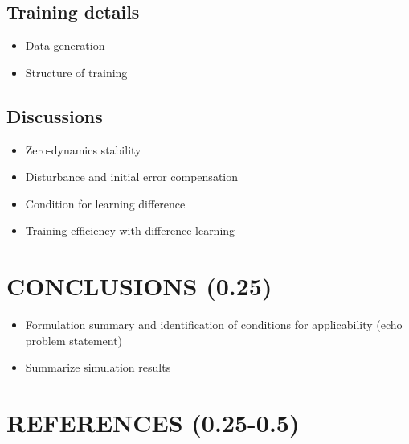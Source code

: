 \subsection{Training details}
\begin{itemize}
\color{grey1}
\item Data generation
\item Structure of training
\end{itemize}

\subsection{Discussions}
\begin{itemize}
\color{grey1}
\item Zero-dynamics stability
\item Disturbance and initial error compensation
\item Condition for learning difference
\item Training efficiency with difference-learning
\end{itemize}

\section{CONCLUSIONS (0.25)}
\label{sec:conclusions}
\begin{itemize}
\color{grey1}
\item Formulation summary and identification of conditions for applicability (echo problem statement)
\item Summarize simulation results
\end{itemize}

\section*{REFERENCES (0.25-0.5)}

\color{grey5}

